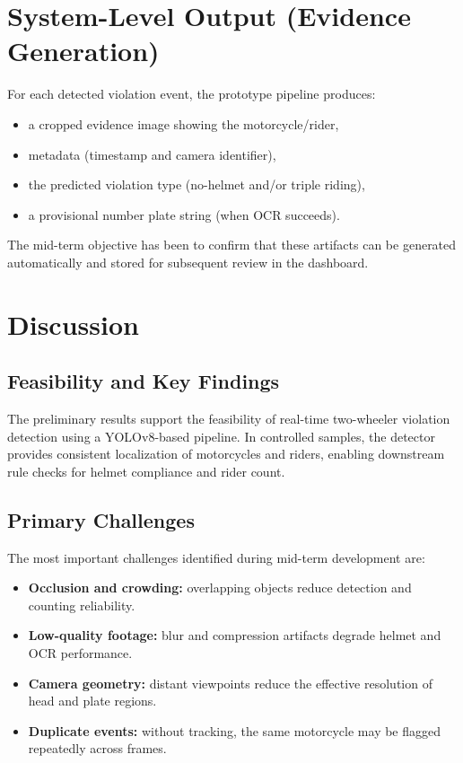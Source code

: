 \section{System-Level Output (Evidence Generation)}
\label{sec:evidence}

For each detected violation event, the prototype pipeline produces:
\begin{itemize}
    \item a cropped evidence image showing the motorcycle/rider,
    \item metadata (timestamp and camera identifier),
    \item the predicted violation type (no-helmet and/or triple riding),
    \item a provisional number plate string (when OCR succeeds).
\end{itemize}
The mid-term objective has been to confirm that these artifacts can be generated automatically and stored for subsequent review in the dashboard.

\section{Discussion}
\label{sec:discussion}

\subsection{Feasibility and Key Findings}
The preliminary results support the feasibility of real-time two-wheeler violation detection using a YOLOv8-based pipeline. In controlled samples, the detector provides consistent localization of motorcycles and riders, enabling downstream rule checks for helmet compliance and rider count.

\subsection{Primary Challenges}
The most important challenges identified during mid-term development are:
\begin{itemize}
    \item \textbf{Occlusion and crowding:} overlapping objects reduce detection and counting reliability.
    \item \textbf{Low-quality footage:} blur and compression artifacts degrade helmet and OCR performance.
    \item \textbf{Camera geometry:} distant viewpoints reduce the effective resolution of head and plate regions.
    \item \textbf{Duplicate events:} without tracking, the same motorcycle may be flagged repeatedly across frames.
\end{itemize}

